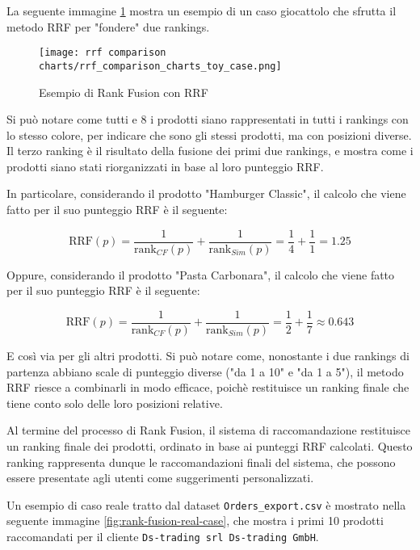 La seguente immagine \ref{fig:rank-fusion-toy-case} mostra un esempio di un caso giocattolo che sfrutta il metodo RRF per "fondere" due rankings.

\begin{figure}[h]
    \centering
    \texttt{[image: rrf comparison charts/rrf\_comparison\_charts\_toy\_case.png]}
    \caption{Esempio di Rank Fusion con RRF}
    \label{fig:rank-fusion-toy-case}
\end{figure}

Si può notare come tutti e 8 i prodotti siano rappresentati in tutti i rankings con lo stesso colore, per indicare che sono gli stessi prodotti, ma con posizioni diverse.
Il terzo ranking è il risultato della fusione dei primi due rankings, e mostra come i prodotti siano stati riorganizzati in base al loro punteggio RRF.

In particolare, considerando il prodotto "Hamburger Classic", il calcolo che viene fatto per il suo punteggio RRF è il seguente:

\begin{equation}
\text{RRF}(p) = \frac{1}{\text{rank}_{CF}(p)} + \frac{1}{\text{rank}_{Sim}(p)} = \frac{1}{4} + \frac{1}{1} = 1.25
\end{equation}

Oppure, considerando il prodotto "Pasta Carbonara", il calcolo che viene fatto per il suo punteggio RRF è il seguente:

\begin{equation}
\text{RRF}(p) = \frac{1}{\text{rank}_{CF}(p)} + \frac{1}{\text{rank}_{Sim}(p)} = \frac{1}{2} + \frac{1}{7} \approx 0.643
\end{equation}

E così via per gli altri prodotti. Si può notare come, nonostante i due rankings di partenza abbiano scale di punteggio diverse ("da 1 a 10" e "da 1 a 5"), il metodo RRF riesce a combinarli in modo efficace, poichè restituisce un ranking finale che tiene conto solo delle loro posizioni relative.

Al termine del processo di Rank Fusion, il sistema di raccomandazione restituisce un ranking finale dei prodotti, ordinato in base ai punteggi RRF calcolati. Questo ranking rappresenta dunque le raccomandazioni finali del sistema, che possono essere presentate agli utenti come suggerimenti personalizzati.

Un esempio di caso reale tratto dal dataset \texttt{Orders\_export.csv} è mostrato nella seguente immagine \ref{fig:rank-fusion-real-case}, che mostra i primi 10 prodotti raccomandati per il cliente \texttt{Ds-trading srl Ds-trading GmbH}.

